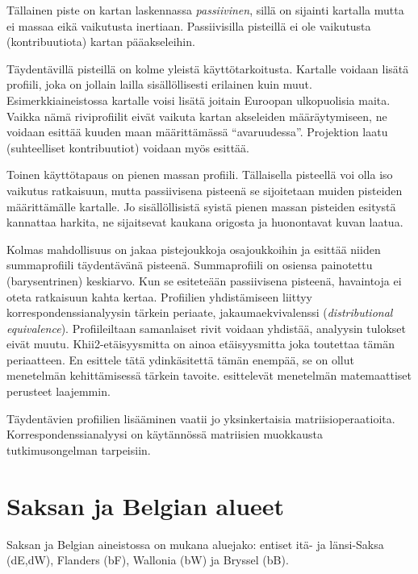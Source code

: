 \documentclass[
  finnish,
]{book}
\begin{document}
Tällainen piste on kartan laskennassa \emph{passiivinen}, sillä on sijainti kartalla
mutta ei massaa eikä vaikutusta inertiaan. Passiivisilla pisteillä ei ole vaikutusta
(kontribuutiota) kartan pääakseleihin.

Täydentävillä pisteillä on kolme yleistä käyttötarkoitusta. Kartalle voidaan lisätä
profiili, joka on jollain lailla sisällöllisesti erilainen kuin muut. Esimerkkiaineistossa
kartalle voisi lisätä joitain Euroopan ulkopuolisia maita. Vaikka nämä riviprofiilit
eivät vaikuta kartan akseleiden määräytymiseen, ne voidaan esittää kuuden maan
määrittämässä ``avaruudessa''. Projektion laatu (suhteelliset kontribuutiot) voidaan myös
esittää.

Toinen käyttötapaus on pienen massan profiili. Tällaisella pisteellä voi olla iso
vaikutus ratkaisuun, mutta passiivisena pisteenä se sijoitetaan muiden pisteiden
määrittämälle kartalle. Jo sisällöllisistä syistä pienen massan pisteiden esitystä
kannattaa harkita, ne sijaitsevat kaukana origosta ja huonontavat kuvan laatua.

Kolmas mahdollisuus on jakaa pistejoukkoja osajoukkoihin ja esittää niiden
summaprofiili täydentävänä pisteenä. Summaprofiili on osiensa painotettu
(barysentrinen) keskiarvo. Kun se esiteteään passiivisena pisteenä, havaintoja ei
oteta ratkaisuun kahta kertaa. Profiilien yhdistämiseen liittyy
korrespondenssianalyysin tärkein periaate, jakaumaekvivalenssi (\emph{distributional
equivalence}). Profiileiltaan samanlaiset rivit voidaan yhdistää, analyysin tulokset
eivät muutu. Khii2-etäisyysmitta on ainoa etäisyysmitta joka toutettaa tämän
periaatteen. En esittele tätä ydinkäsitettä tämän enempää, se on ollut menetelmän
kehittämisessä tärkein tavoite. \citet{RefWorks:doc:5a857a43e4b0ed2d44664d75} esittelevät
menetelmän matemaattiset perusteet laajemmin.

Täydentävien profiilien lisääminen vaatii jo yksinkertaisia matriisioperaatioita.
Korrespondenssianalyysi on käytännössä matriisien muokkausta tutkimusongelman
tarpeisiin.

\hypertarget{saksan-ja-belgian-alueet}{%
\section{Saksan ja Belgian alueet}\label{saksan-ja-belgian-alueet}}

Saksan ja Belgian aineistossa on mukana aluejako: entiset itä- ja länsi-Saksa
(dE,dW), Flanders (bF), Wallonia (bW) ja Bryssel (bB).
\end{document}

